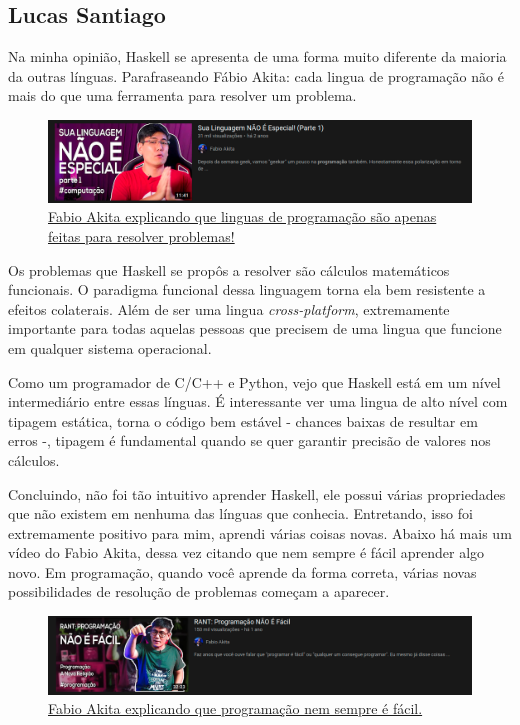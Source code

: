 \documentclass[
  12pt,				         %
  oneside,			       %
  a4paper,			       %
  english,		       	 %
  brazil,			      	 %
]{abntex2}
\begin{document}
\begin{apendicesenv}
        \newpage 

        \chapter{Lucas Santiago}

        Na minha opinião, Haskell se apresenta de uma forma muito diferente da maioria da outras línguas. 
        Parafraseando Fábio Akita: cada lingua de programação não é mais do que uma ferramenta
        para resolver um problema.

        \begin{figure}[ht]
          \includegraphics[width =\textwidth]{fabio_akita_lingua.png}
          \caption{\href{https://www.youtube.com/watch?v=p9-WuJbVHHc}{Fabio Akita explicando que linguas de programação são apenas feitas para resolver problemas!}}
        \end{figure}

        Os problemas que Haskell se propôs a resolver são cálculos matemáticos
        funcionais. O paradigma funcional dessa linguagem torna ela bem resistente a efeitos colaterais. Além de ser uma lingua
        \emph{cross-platform}, extremamente importante para todas aquelas pessoas que precisem de uma lingua que funcione
        em qualquer sistema operacional. 

        Como um programador de C/C++ e Python, vejo que Haskell está em um nível intermediário entre essas línguas.
        É interessante ver uma lingua de alto nível com tipagem estática, torna o código bem estável - chances baixas de 
        resultar em erros -, tipagem é fundamental quando se quer garantir precisão de valores nos cálculos.

        Concluindo, não foi tão intuitivo aprender Haskell, ele possui várias propriedades que não existem em nenhuma das línguas
        que conhecia. Entretando, isso foi extremamente positivo para mim, aprendi várias coisas novas. Abaixo há
        mais um vídeo do Fabio Akita, dessa vez citando que nem sempre é fácil aprender algo novo. Em programação,
        quando você aprende da forma correta, várias novas possibilidades de resolução de problemas começam a aparecer.

        \begin{figure}[ht]
          \includegraphics[width =\textwidth]{fabio_akita_programar_eh_dificil.png}
          \caption{\href{https://www.youtube.com/watch?v=V7oUDL7E1g4}{Fabio Akita explicando que programação nem sempre é fácil.}}
        \end{figure}


\end{apendicesenv}
\end{document}
